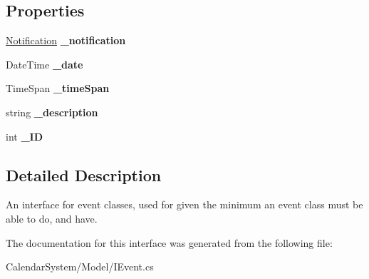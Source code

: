 \subsection*{Properties}
\begin{DoxyCompactItemize}
\item 
\hypertarget{interface_calendar_system_1_1_model_1_1_i_event_a9fa4752d2b8e05d79b70951b46cb1d7a}{\hyperlink{class_calendar_system_1_1_model_1_1_notification}{Notification} {\bfseries \+\_\+notification}}\label{interface_calendar_system_1_1_model_1_1_i_event_a9fa4752d2b8e05d79b70951b46cb1d7a}

\item 
\hypertarget{interface_calendar_system_1_1_model_1_1_i_event_a0c3e5af1e6f4c3fc5878677b0a37dc60}{Date\+Time {\bfseries \+\_\+date}}\label{interface_calendar_system_1_1_model_1_1_i_event_a0c3e5af1e6f4c3fc5878677b0a37dc60}

\item 
\hypertarget{interface_calendar_system_1_1_model_1_1_i_event_a8bc4cc2289f2e187753374309e9e905e}{Time\+Span {\bfseries \+\_\+time\+Span}}\label{interface_calendar_system_1_1_model_1_1_i_event_a8bc4cc2289f2e187753374309e9e905e}

\item 
\hypertarget{interface_calendar_system_1_1_model_1_1_i_event_a8a59754858a0ce6943d6a21471566cee}{string {\bfseries \+\_\+description}}\label{interface_calendar_system_1_1_model_1_1_i_event_a8a59754858a0ce6943d6a21471566cee}

\item 
\hypertarget{interface_calendar_system_1_1_model_1_1_i_event_a48d61475d0de8c5a6b925057cdfeb1bd}{int {\bfseries \+\_\+\+I\+D}}\label{interface_calendar_system_1_1_model_1_1_i_event_a48d61475d0de8c5a6b925057cdfeb1bd}

\end{DoxyCompactItemize}


\subsection{Detailed Description}
An interface for event classes, used for given the minimum an event class must be able to do, and have. 



The documentation for this interface was generated from the following file\+:\begin{DoxyCompactItemize}
\item 
Calendar\+System/\+Model/I\+Event.\+cs\end{DoxyCompactItemize}
